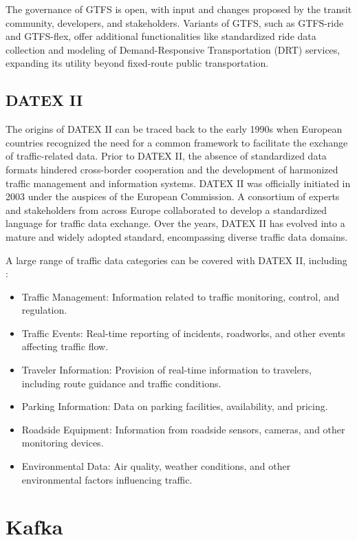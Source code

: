 \documentclass[12pt]{report}
\begin{document}
	The governance of GTFS is open, with input and changes proposed by the transit community, developers, and stakeholders. Variants of GTFS, such as GTFS-ride and GTFS-flex, offer additional functionalities like standardized ride data collection and modeling of Demand-Responsive Transportation (DRT) services, expanding its utility beyond fixed-route public transportation.
	

	\subsection{DATEX II}
	
	 The origins of DATEX II can be traced back to the early 1990s when European countries recognized the need for a common framework to facilitate the exchange of traffic-related data. Prior to DATEX II, the absence of standardized data formats hindered cross-border cooperation and the development of harmonized traffic management and information systems. DATEX II was officially initiated in 2003 under the auspices of the European Commission. A consortium of experts and stakeholders from across Europe collaborated to develop a standardized language for traffic data exchange. Over the years, DATEX II has evolved into a mature and widely adopted standard, encompassing diverse traffic data domains.
	 
	 A large range of traffic data categories can  be covered with  DATEX II, including : 
	 \begin{itemize}[noitemsep]
	 	\item    Traffic Management: Information related to traffic monitoring, control, and regulation.
	 	\item Traffic Events: Real-time reporting of incidents, roadworks, and other events affecting traffic flow.
	 	\item Traveler Information: Provision of real-time information to travelers, including route guidance and traffic conditions.
	 	\item Parking Information: Data on parking facilities, availability, and pricing.
	 	\item Roadside Equipment: Information from roadside sensors, cameras, and other monitoring devices.
	 	\item Environmental Data: Air quality, weather conditions, and other environmental factors influencing traffic.
	 	
	 	
	 \end{itemize}
	 
	\section{Kafka}
	\label{sec:kafka}
	
\end{document}

